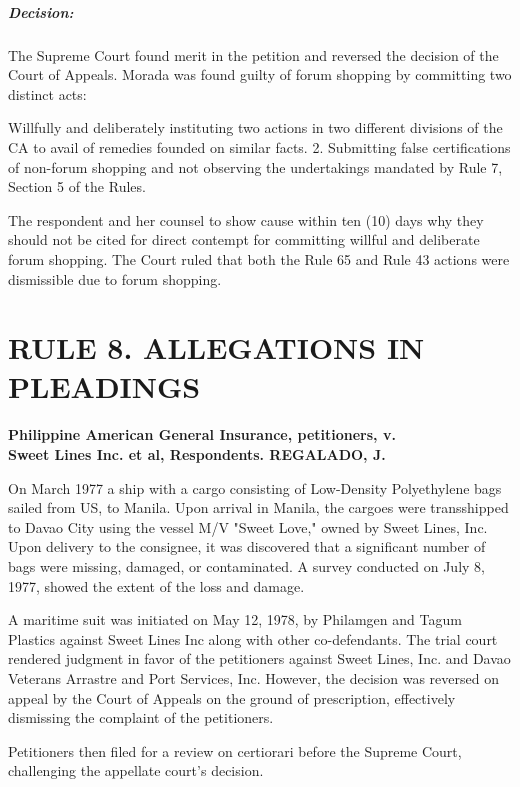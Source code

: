 \documentclass[
12pt,
oneside,
onehalfspacing,
headsepline
]{DigestCollection}
\begin{document}
\paragraph{Decision:}

The Supreme Court found merit in the petition and reversed the decision of the Court of Appeals. Morada was found guilty of forum shopping by committing two distinct acts:

Willfully and deliberately instituting two actions in two different divisions of the CA to avail of remedies founded on similar facts. 2. Submitting false certifications of non-forum shopping and not observing the undertakings mandated by Rule 7, Section 5 of the Rules.

The respondent and her counsel to show cause within ten (10) days why they should not be cited for direct contempt for committing willful and deliberate forum shopping. The Court ruled that both the Rule 65 and Rule 43 actions were dismissible due to forum shopping.

\chapter{RULE 8. ALLEGATIONS IN PLEADINGS }


\noindent\textbf{Philippine American General Insurance, petitioners, v. \\Sweet Lines Inc. et al, Respondents. REGALADO, J.}\vspace{0.4cm}

On March 1977 a ship with a cargo consisting of Low-Density Polyethylene bags sailed from US, to Manila. Upon arrival in Manila, the cargoes were transshipped to Davao City using the vessel M/V "Sweet Love," owned by Sweet Lines, Inc. Upon delivery to the consignee, it was discovered that a significant number of bags were missing, damaged, or contaminated. A survey conducted on July 8, 1977, showed the extent of the loss and damage.

A maritime suit was initiated on May 12, 1978, by Philamgen and Tagum Plastics against Sweet Lines Inc along with other co-defendants. The trial court rendered judgment in favor of the petitioners against Sweet Lines, Inc. and Davao Veterans Arrastre and Port Services, Inc. However, the decision was reversed on appeal by the Court of Appeals on the ground of prescription, effectively dismissing the complaint of the petitioners.

Petitioners then filed for a review on certiorari before the Supreme Court, challenging the appellate court's decision.
\end{document}
